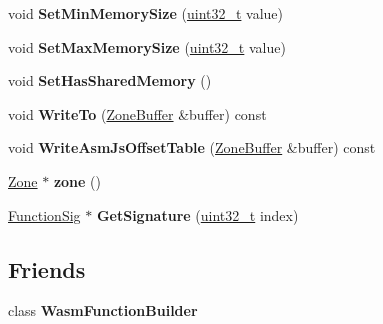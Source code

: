 \begin{DoxyCompactItemize}
void {\bfseries Set\+Min\+Memory\+Size} (\mbox{\hyperlink{classuint32__t}{uint32\+\_\+t}} value)
\item 
\mbox{\label{classv8_1_1internal_1_1wasm_1_1WasmModuleBuilder_aad3030a809ab8aa018ee23120b638faa}} 
void {\bfseries Set\+Max\+Memory\+Size} (\mbox{\hyperlink{classuint32__t}{uint32\+\_\+t}} value)
\item 
\mbox{\label{classv8_1_1internal_1_1wasm_1_1WasmModuleBuilder_a7f3d5675444ed73edb443b52231cf6ca}} 
void {\bfseries Set\+Has\+Shared\+Memory} ()
\item 
\mbox{\label{classv8_1_1internal_1_1wasm_1_1WasmModuleBuilder_a91832529420eac90dbff8f7d05b5069c}} 
void {\bfseries Write\+To} (\mbox{\hyperlink{classv8_1_1internal_1_1wasm_1_1ZoneBuffer}{Zone\+Buffer}} \&buffer) const
\item 
\mbox{\label{classv8_1_1internal_1_1wasm_1_1WasmModuleBuilder_a1d62c143fd85eb53596ed0b09eee89ef}} 
void {\bfseries Write\+Asm\+Js\+Offset\+Table} (\mbox{\hyperlink{classv8_1_1internal_1_1wasm_1_1ZoneBuffer}{Zone\+Buffer}} \&buffer) const
\item 
\mbox{\label{classv8_1_1internal_1_1wasm_1_1WasmModuleBuilder_aebbeb45e0f1e4d3b178c21622e81e403}} 
\mbox{\hyperlink{classv8_1_1internal_1_1Zone}{Zone}} $\ast$ {\bfseries zone} ()
\item 
\mbox{\label{classv8_1_1internal_1_1wasm_1_1WasmModuleBuilder_a529f5905f2124bebda0c00364b729e6d}} 
\mbox{\hyperlink{classv8_1_1internal_1_1Signature}{Function\+Sig}} $\ast$ {\bfseries Get\+Signature} (\mbox{\hyperlink{classuint32__t}{uint32\+\_\+t}} index)
\end{DoxyCompactItemize}
\subsection*{Friends}
\begin{DoxyCompactItemize}
\item 
\mbox{\label{classv8_1_1internal_1_1wasm_1_1WasmModuleBuilder_a0210e47d50d0e44fd0f929739a275fae}} 
class {\bfseries Wasm\+Function\+Builder}
\end{DoxyCompactItemize}


